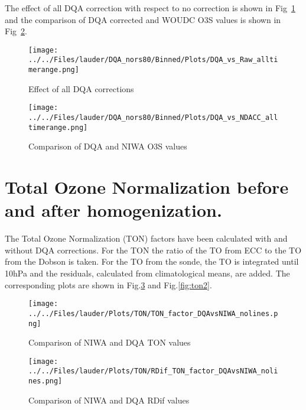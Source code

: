 The effect of all DQA correction with respect to no correction is shown in Fig~\ref{fig:dqa_all} and the comparison of DQA corrected and
WOUDC O3S values is shown in Fig~\ref{fig:fig_dqa_ndacc}.

                        \begin{figure}
        \centering
\texttt{[image: ../../Files/lauder/DQA\_nors80/Binned/Plots/DQA\_vs\_Raw\_alltimerange.png]}
    \caption{Effect of all DQA corrections}
            \label{fig:dqa_all}
    \end{figure}
%
                        \begin{figure}
        \centering
\texttt{[image: ../../Files/lauder/DQA\_nors80/Binned/Plots/DQA\_vs\_NDACC\_alltimerange.png]}
    \caption{Comparison of DQA and NIWA O3S values}
            \label{fig:fig_dqa_ndacc}
    \end{figure}
%
%  


%

%

%
\section{Total Ozone Normalization before and after homogenization.}

The Total Ozone Normalization (TON) factors have been calculated with and without DQA corrections. For the TON the ratio of the
TO from ECC to the TO from the Dobson is taken. For the TO from the sonde, the TO is integrated until 10hPa and the residuals, calculated from
climatological means, are added. The corresponding plots are shown in Fig.\ref{fig:ton1} and  Fig.\ref{fig:ton2}.

                                                \begin{figure}
        \centering
\texttt{[image: ../../Files/lauder/Plots/TON/TON\_factor\_DQAvsNIWA\_nolines.png]}
    \caption{Comparison of NIWA and DQA TON values}
            \label{fig:ton1}
    \end{figure}

                                                \begin{figure}
        \centering
\texttt{[image: ../../Files/lauder/Plots/TON/RDif\_TON\_factor\_DQAvsNIWA\_nolines.png]}
    \caption{Comparison of NIWA and DQA RDif values}
            \label{fig:ton3}
    \end{figure}

